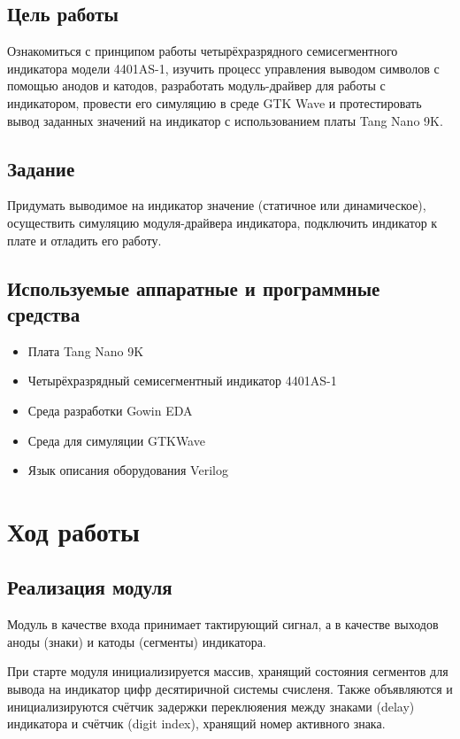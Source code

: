 \section*{Цель работы} 

Ознакомиться с принципом работы четырёхразрядного семисегментного индикатора модели 4401AS-1, изучить процесс управления выводом символов с помощью анодов и катодов, разработать модуль-драйвер для работы с индикатором, провести его симуляцию в среде GTK Wave и протестировать вывод заданных значений на индикатор с использованием платы Tang Nano 9K.

\section*{Задание}

Придумать выводимое на индикатор значение (статичное или динамическое),
осуществить симуляцию модуля-драйвера индикатора, подключить индикатор к плате
и отладить его работу.

\section*{Используемые аппаратные и программные средства}
\begin{itemize}
    \item Плата Tang Nano 9K
    \item Четырёхразрядный семисегментный
индикатор 4401AS-1
    \item Среда разработки Gowin EDA
    \item Среда для симуляции GTKWave
    \item Язык описания оборудования Verilog
\end{itemize}

\chapter{Ход работы}

\section{Реализация модуля}

Модуль в качестве входа принимает тактирующий сигнал, а в качестве выходов аноды (знаки) и катоды (сегменты) индикатора.

При старте модуля инициализируется массив, хранящий состояния сегментов для вывода на индикатор цифр десятиричной системы счисленя.
Также объявляются и инициализируются счётчик задержки переклюяения между знаками (delay) индикатора и счётчик (digit index), хранящий номер активного знака.

